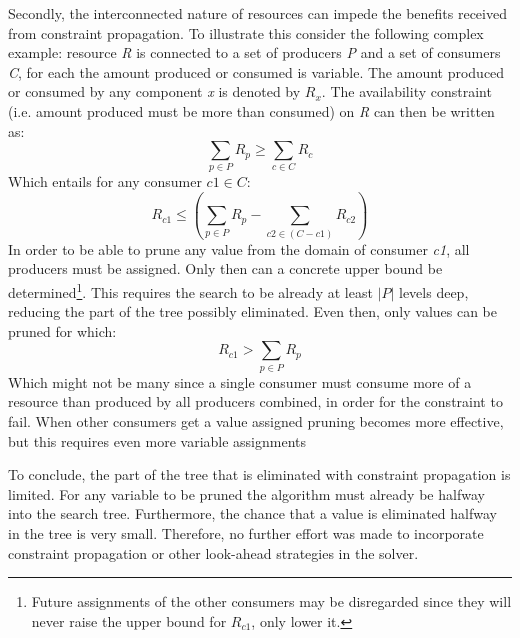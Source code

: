 Secondly, the interconnected nature of resources can impede the benefits received from constraint propagation. To illustrate this consider the following complex example: resource \emph{R} is connected to a set of producers \emph{P} and a set of consumers \emph{C}, for each the amount produced or consumed is variable. The amount produced or consumed by any component \emph{x} is denoted by $R_x$. The availability constraint (i.e. amount produced must be more than consumed) on \emph{R} can then be written as:
$$\sum_{p \in P}R_p \geq \sum_{c \in C}R_c$$
Which entails for any consumer $c1 \in C$: 
$$R_{c1} \leq \left(\sum_{p \in P} R_p - \sum_{c2 \in (C-c1)} R_{c2}\right)$$
In order to be able to prune any value from the domain of consumer \emph{c1}, all producers must be assigned. Only then can a concrete upper bound be determined\setcounter{footnote}{1}\footnote{Future assignments of the other consumers may be disregarded since they will never raise the upper bound for $R_{c1}$, only lower it.}. This requires the search to be already at least $|P|$ levels deep, reducing the part of the tree possibly eliminated. Even then, only values can be pruned for which:
$$R_{c1} > \sum_{p \in P} R_p$$
Which might not be many since a single consumer must consume more of a resource than produced by all producers combined, in order for the constraint to fail. When other consumers get a value assigned pruning becomes more effective, but this requires even more variable assignments

To conclude, the part of the tree that is eliminated with constraint propagation is limited. For any variable to be pruned the algorithm must already be halfway into the search tree. Furthermore, the chance that a value is eliminated halfway in the tree is very small. Therefore, no further effort was made to incorporate constraint propagation or other look-ahead strategies in the solver.



	









